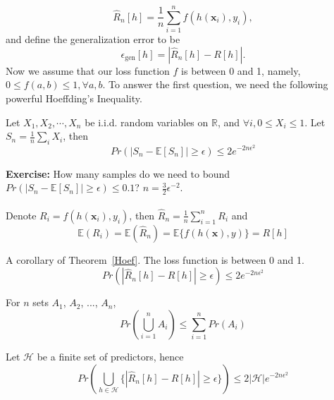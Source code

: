 \documentclass[12pt]{report}
\def\cH{\mathcal H}
\def\bx{\bm{x}}
\def\bbE{\mathbb E}
\def\bbR{\mathbb R}
\begin{document}
\begin{equation}
  \label{eq:empirical_risk}
  \hat R_n [h] = \frac{1}{n} \sum_{i = 1}^n f(h(\bx_i), y_i),
\end{equation}
and define the generalization error to be 
\begin{equation}
  \label{eq:gene_err}
  \epsilon_{\text{gen}} [h] = | \hat R_n [h] - R[h] |.
\end{equation}
Now we assume that our loss function $f$ is between 0 and 1, namely, $0 \leq f(a, b) \leq 1, \forall a, b$. To answer the first question, we need the following powerful Hoeffding's Inequality.
\begin{theorem}
\label{Hoef}
Let $X_1, X_2, \cdots, X_n$ be i.i.d. random variables on $\bbR$, and $\forall i, 0 \leq X_i \leq 1$. Let $S_n = \frac{1}{n}\sum_i X_i$, then
\begin{equation}
  \label{eq:hoef}
  Pr(|S_n - \bbE[S_n]| \geq \epsilon ) \leq 2 e^{-2n\epsilon^2}
\end{equation}
\end{theorem}
\textbf{Exercise:} How many samples do we need to bound $Pr(|S_n - \bbE[S_n]| \geq \epsilon ) \leq 0.1$? $n = \frac{3}{2}\epsilon^{-2}$.
~\\~\\
Denote $R_i = f(h(\bx_i), y_i)$, then $\hat R_n = \frac{1}{n}\sum_{i=1}^n{R_i}$ and
\begin{equation}
	\label{eq:exp_empirical_risk}
  	\bbE(R_i) = \bbE(\hat R_n) = \bbE \{ f(h(\bx), y)\} = R[h]
\end{equation}
\begin{corollary}
	\label{Cor_Concentration_inequality}
	A corollary of Theorem~\ref{Hoef}. The loss function is between 0 and 1.  
	\begin{equation}
	\label{eq:concentration_inequality}
		Pr(|\hat R_n [h] - R[h]| \geq \epsilon ) \leq 2 e^{-2n\epsilon^2}
	\end{equation}
\end{corollary}
\begin{lemma}
	\label{union_bound}
	For $n$ sets $A_1$, $A_2$, ..., $A_n$, 
	\begin{equation}
	\label{eq:union_bound}
		Pr\left( \bigcup_{i=1}^{n}{A_i}\right) \leq \sum_{i=1}^n{Pr(A_i)}
	\end{equation}	
\end{lemma}
Let $\cH$ be a finite set of predictors, hence
\begin{equation}
\label{eq:finite_set_H}
	Pr \left( \bigcup_{h \in \cH}\{ |\hat R_n [h] - R[h]| \geq \epsilon \} \right) \leq 2 |\cH | e^{-2n\epsilon^2}
\end{equation}
\end{document}
